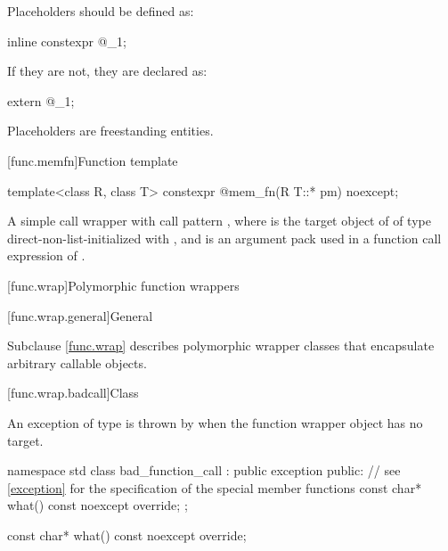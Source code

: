 \pnum
Placeholders should be defined as:
\begin{codeblock}
inline constexpr @\unspec@ _1{};
\end{codeblock}
If they are not, they are declared as:
\begin{codeblock}
extern @\unspec@ _1;
\end{codeblock}%

\pnum
Placeholders are freestanding entities.

[func.memfn]{Function template }%

%
\begin{itemdecl}
template<class R, class T> constexpr @\unspec@ mem_fn(R T::* pm) noexcept;
\end{itemdecl}

\begin{itemdescr}
\pnum
\returns
A simple call wrapper 
with call pattern , where
 is the target object of  of type 
direct-non-list-initialized with , and
 is an argument pack
used in a function call expression of .
\end{itemdescr}

[func.wrap]{Polymorphic function wrappers}%

[func.wrap.general]{General}%

\pnum
Subclause \ref{func.wrap} describes polymorphic wrapper classes that
encapsulate arbitrary callable objects.

[func.wrap.badcall]{Class }%
%

\pnum
An exception of type  is thrown by
when the function wrapper object has no target.

\begin{codeblock}
namespace std {
  class bad_function_call : public exception {
  public:
    // see \ref{exception} for the specification of the special member functions
    const char* what() const noexcept override;
  };
}
\end{codeblock}

%
\begin{itemdecl}
const char* what() const noexcept override;
\end{itemdecl}

